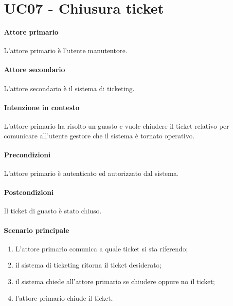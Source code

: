 \section{UC07 - Chiusura ticket}\label{uc:07}

\paragraph{Attore primario} L'attore primario è l'utente manutentore.
\paragraph{Attore secondario} L'attore secondario è il sistema di ticketing.
\paragraph{Intenzione in contesto} L'attore primario ha risolto un guasto e vuole chiudere il ticket relativo per comunicare all'utente gestore che il sistema è tornato operativo.

\paragraph{Precondizioni} L'attore primario è autenticato ed autorizzato dal sistema.

\paragraph{Postcondizioni} Il ticket di guasto è stato chiuso.

\paragraph{Scenario principale}

\begin{enumerate}
    \item L'attore primario comunica a quale ticket si sta riferendo;
    \item il sistema di ticketing ritorna il ticket desiderato;
    \item il sistema chiede all'attore primario se chiudere oppure no il ticket;
    \item l'attore primario chiude il ticket.
\end{enumerate}
